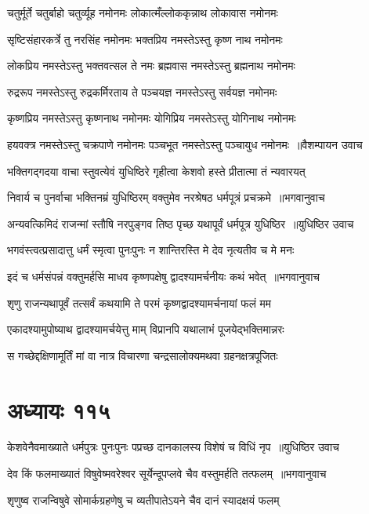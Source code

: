 \twolineshloka
{चतुर्मूर्ते चतुर्बाहो चतुर्व्यूह नमोनमः}
{लोकात्मँल्लोककृन्नाथ लोकावास नमोनमः}


\twolineshloka
{सृष्टिसंहारकर्त्रे तु नरसिंह नमोनमः}
{भक्तप्रिय नमस्तेऽस्तु कृष्ण नाथ नमोनमः}


\twolineshloka
{लोकप्रिय नमस्तेऽस्तु भक्तवत्सल ते नमः}
{ब्रह्मवास नमस्तेऽस्तु ब्रह्मनाथ नमोनमः}


\twolineshloka
{रुद्ररूप नमस्तेऽस्तु रुद्रकर्मिरताय ते}
{पञ्चयज्ञ नमस्तेऽस्तु सर्वयज्ञ नमोनमः}


\twolineshloka
{कृष्णप्रिय नमस्तेऽस्तु कृष्णनाथ नमोनमः}
{योगिप्रिय नमस्तेऽस्तु योगिनाथ नमोनमः}


\threelineshloka
{हयवक्त्र नमस्तेऽस्तु चक्रपाणे नमोनमः}
{पञ्चभूत नमस्तेऽस्तु पञ्चायुध नमोनमः ॥वैशम्पायन उवाच}
{}


\twolineshloka
{भक्तिगद्गदया वाचा स्तुवत्येवं युधिष्ठिरे}
{गृहीत्वा केशवो हस्ते प्रीतात्मा तं न्यवारयत्}


\threelineshloka
{निवार्य च पुनर्वाचा भक्तिनम्रं युधिष्ठिरम्}
{वक्तुमेव नरश्रेषठ धर्मपूत्रं प्रचक्रमे ॥भगवानुवाच}
{}


\threelineshloka
{अन्यवत्किमिदं राजन्मां स्तौषि नरपुङ्गव}
{तिष्ठ पृच्छ यथापूर्वं धर्मपूत्र युधिष्ठिर ॥युधिष्ठिर उवाच}
{}


\twolineshloka
{भगवंस्त्वत्प्रसादात्तु धर्मं स्मृत्वा पुनःपुनः}
{न शान्तिरस्ति मे देव नृत्यतीव च मे मनः}


\threelineshloka
{इदं च धर्मसंपन्नं वक्तुमर्हसि माधव}
{कृष्णपक्षेषु द्वादश्यामर्चनीयः कथं भवेत् ॥भगवानुवाच}
{}


\twolineshloka
{शृणु राजन्यथापूर्वं तत्सर्वं कथयामि ते}
{परमं कृष्णद्वादश्यामर्चनायां फलं मम}


\twolineshloka
{एकादश्यामुपोष्याथ द्वादश्यामर्चयेत्तु माम्}
{विप्रानपि यथालाभं पूजयेद्भक्तिमान्नरः}


\twolineshloka
{स गच्छेद्दक्षिणामूर्तिं मां वा नात्र विचारणा}
{चन्द्रसालोक्यमथवा ग्रहनक्षत्रपूजितः}


\chapter{अध्यायः ११५}
\threelineshloka
{केशवेनैवमाख्याते धर्मपुत्रः पुनःपुनः}
{पप्रच्छ दानकालस्य विशेषं च विधिं नृप ॥युधिष्ठिर उवाच}
{}


\threelineshloka
{देव किं फलमाख्यातं विषुवेष्मवरेश्वर}
{सूर्येन्दूपप्लवे चैव वस्तुमर्हति तत्फलम् ॥भगवानुवाच}
{}


\twolineshloka
{शृणुष्व राजन्विषुवे सोमार्कग्रहणेषु च}
{व्यतीपातेऽयने चैव दानं स्यादक्षयं फलम्}



